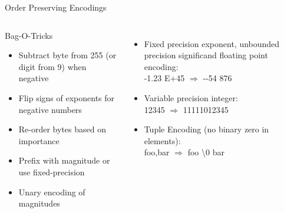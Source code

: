 \documentclass[t,landscape]{beamer}
\begin{document}
\begin{frame}{Order Preserving Encodings}
\begin{columns}
\begin{block}{Bag-O-Tricks}
\begin{itemize}
\scriptsize
\item{Subtract byte from 255 (or digit from 9) when negative}
\item{Flip signs of exponents for negative numbers}
\item{Re-order bytes based on importance}
\item{Prefix with magnitude or use fixed-precision}
\item{Unary encoding of magnitudes}
\end{itemize}
\end{block}
\begin{itemize}
\item{Fixed precision exponent, unbounded precision significand floating point encoding: \\
{\color{red}-}{\color{blue}1.23} E{\color{green}+}{\color{orange}45} $\Rightarrow$
{\color{red}-}{\color{green}-}{\color{orange}54}{\color{blue}} {\color{blue}876}
}
\item{Variable precision integer: \\
{\color{red}12345} $\Rightarrow$ {\color{blue}11111}0{\color{red}12345}
}
\item{Tuple Encoding (no binary zero in elements): \\
{\color{red}foo},{\color{blue}bar} $\Rightarrow$ {\color{red}foo} {\textbackslash}0 {\color{blue}bar}
}
\end{itemize}
\end{columns}
\end{frame}
\end{document}
